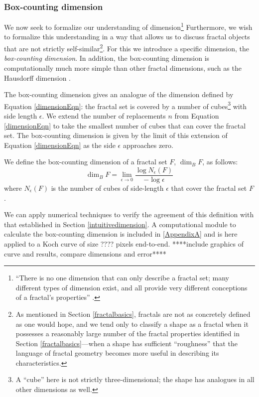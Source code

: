\subsubsection{Box-counting dimension}
We now seek to formalize our understanding of dimension\footnote{``There is no one dimension that can only describe a fractal set; many different types of dimension exist, and all provide very different conceptions of a fractal's properties'' \citep{fractaltextbook}.} Furthermore, we wish to formalize this understanding in a way that allows us to discuss fractal objects that are not strictly self-similar\footnote{As mentioned in Section \ref{fractalbasics}, fractals are not as concretely defined as one would hope, and we tend only to classify a shape as a fractal when it possesses a reasonably large number of the fractal properties identified in Section \ref{fractalbasics}---when a shape has sufficient ``roughness'' that the language of fractal geometry becomes more useful in describing its characteristics.}. For this we introduce a specific dimension, the \textit{box-counting dimension}. In addition, the box-counting dimension is computationally much more simple than other fractal dimensions, such as the Hausdorff dimension \citep{fractaltextbook}.

The box-counting dimension gives an analogue of the dimension defined by Equation \ref{dimensionEqn}: the fractal set is covered by a number of cubes\footnote{A ``cube'' here is not strictly three-dimensional; the shape has analogues in all other dimensions as well.} with side length $\epsilon$. We extend the number of replacements $ n $ from Equation \ref{dimensionEqn} to take the smallest number of cubes that can cover the fractal set. The box-counting dimension is given by the limit of this extension of Equation \ref{dimensionEqn} as the side $\epsilon$ approaches zero.

\begin{mydef} We define the box-counting dimension of a fractal set $ F $, $\operatorname{dim}_B F $, as follows:
\begin{equation}\operatorname{dim}_B F = \lim_{\epsilon \to 0} \frac{\log N_\epsilon(F)}{-\log\epsilon}
\end{equation}
where $N_\epsilon(F)$ is the number of cubes of side-length $\epsilon$ that cover the fractal set $F$.
\end{mydef}

\begin{myexample}We can apply numerical techniques to verify the agreement of this definition with that established in Section \ref{intuitivedimension}. A computational module to calculate the box-counting dimension is included in \ref{AppendixA} and is here applied to a Koch curve of size ???? pixels end-to-end. ****include graphics of curve and results, compare dimensions and error****  \end{myexample}

